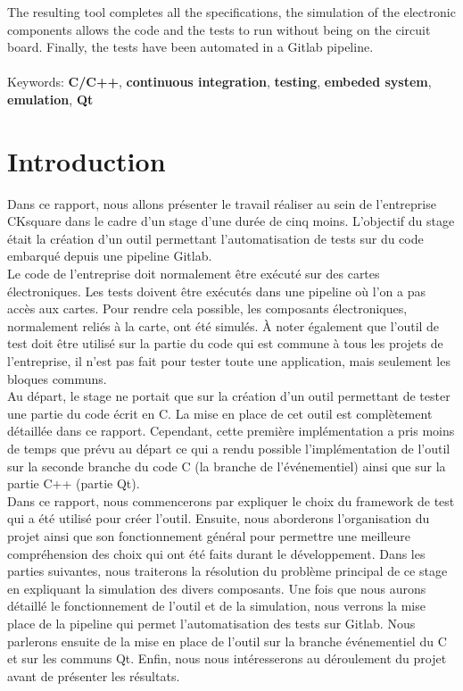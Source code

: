 \documentclass[a4paper]{article}
\begin{document}
The resulting tool completes all the specifications, the simulation of the
electronic components allows the code and the tests to run without being on the
circuit board. Finally, the tests have been automated in a Gitlab pipeline.
\\~\\

\noindent
Keywords: \textbf{C/C++}, \textbf{continuous integration}, \textbf{testing},
\textbf{embeded system}, \textbf{emulation}, \textbf{Qt}

\clearpage{}

\pagestyle{plain}
\setcounter{page}{1}
\clearpage
\section*{Introduction}

Dans ce rapport, nous allons présenter le travail réaliser au sein de
l'entreprise CKsquare dans le cadre d'un stage d'une durée de cinq moins.
L'objectif du stage était la création d'un outil permettant l'automatisation de
tests sur du code embarqué depuis une pipeline Gitlab.\\

Le code de l'entreprise doit normalement être exécuté sur des cartes
électroniques. Les tests doivent être exécutés dans une pipeline où l'on a pas
accès aux cartes. Pour rendre cela possible, les composants électroniques,
normalement reliés à la carte, ont été simulés. À noter également que l'outil de
test doit être utilisé sur la partie du code qui est commune à tous les projets
de l'entreprise, il n'est pas fait pour tester toute une application, mais
seulement les bloques communs.\\

Au départ, le stage ne portait que sur la création d'un outil permettant de
tester une partie du code écrit en C. La mise en place de cet outil est
complètement détaillée dans ce rapport. Cependant, cette première implémentation
a pris moins de temps que prévu au départ ce qui a rendu possible
l'implémentation de l'outil sur la seconde branche du code C (la branche
de l'événementiel) ainsi que sur la partie C++ (partie Qt).\\

Dans ce rapport, nous commencerons par expliquer le choix du framework de test
qui a été utilisé pour créer l'outil. Ensuite, nous aborderons l'organisation du
projet ainsi que son fonctionnement général pour permettre une meilleure
compréhension des choix qui ont été faits durant le développement. Dans les
parties suivantes, nous traiterons la résolution du problème principal de ce
stage en expliquant la simulation des divers composants. Une fois que nous aurons
détaillé le fonctionnement de l'outil et de la simulation, nous verrons la mise
place de la pipeline qui permet l'automatisation des tests sur Gitlab. Nous
parlerons ensuite de la mise en place de l'outil sur la branche événementiel du
C et sur les communs Qt. Enfin, nous nous intéresserons au déroulement du projet
avant de présenter les résultats.
\end{document}
